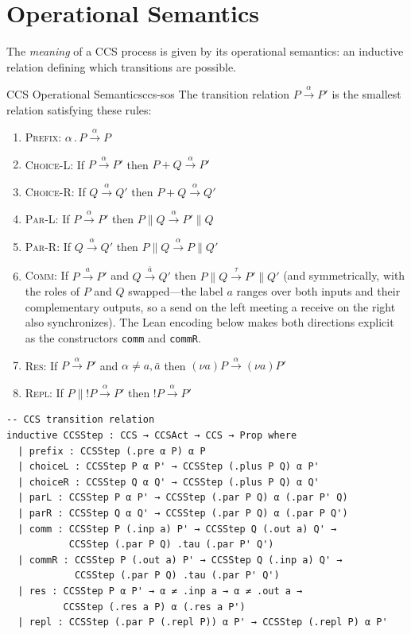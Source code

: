 \documentclass[11pt, a4paper, oneside]{book}
\newcommand{\Par}{\mathbin{\|}}
\newcommand{\pref}{\mathbin{.}}
\newcommand{\res}[1]{(\nu #1)}
\newcommand{\repl}{\mathbin{!}}
\newcommand{\lc}[1]{\texttt{#1}}
\begin{document}
\section{Operational Semantics}

The \emph{meaning} of a CCS process is given by its operational semantics:
an inductive relation defining which transitions are possible.

\begin{defn}{CCS Operational Semantics}{ccs-sos}
The transition relation $P \xrightarrow{\alpha} P'$ is the smallest relation
satisfying these rules:
\begin{enumerate}[nosep, label=(\textsc{\alph*})]
\item \textsc{Prefix:} $\alpha \pref P \xrightarrow{\alpha} P$
\item \textsc{Choice-L:} If $P \xrightarrow{\alpha} P'$ then
  $P + Q \xrightarrow{\alpha} P'$
\item \textsc{Choice-R:} If $Q \xrightarrow{\alpha} Q'$ then
  $P + Q \xrightarrow{\alpha} Q'$
\item \textsc{Par-L:} If $P \xrightarrow{\alpha} P'$ then
  $P \Par Q \xrightarrow{\alpha} P' \Par Q$
\item \textsc{Par-R:} If $Q \xrightarrow{\alpha} Q'$ then
  $P \Par Q \xrightarrow{\alpha} P \Par Q'$
\item \textsc{Comm:} If $P \xrightarrow{a} P'$ and $Q \xrightarrow{\bar{a}} Q'$
  then $P \Par Q \xrightarrow{\tau} P' \Par Q'$ (and symmetrically, with the
  roles of $P$ and $Q$ swapped---the label $a$ ranges over both inputs and
  their complementary outputs, so a send on the left meeting a receive on the
  right also synchronizes). The Lean encoding below makes both directions
  explicit as the constructors \lc{comm} and \lc{commR}.
\item \textsc{Res:} If $P \xrightarrow{\alpha} P'$ and $\alpha \neq a, \bar{a}$
  then $\res{a} P \xrightarrow{\alpha} \res{a} P'$
\item \textsc{Repl:} If $P \Par \repl P \xrightarrow{\alpha} P'$
  then $\repl P \xrightarrow{\alpha} P'$
\end{enumerate}
\end{defn}

\begin{leanbox}
\begin{verbatim}
-- CCS transition relation
inductive CCSStep : CCS → CCSAct → CCS → Prop where
  | prefix : CCSStep (.pre α P) α P
  | choiceL : CCSStep P α P' → CCSStep (.plus P Q) α P'
  | choiceR : CCSStep Q α Q' → CCSStep (.plus P Q) α Q'
  | parL : CCSStep P α P' → CCSStep (.par P Q) α (.par P' Q)
  | parR : CCSStep Q α Q' → CCSStep (.par P Q) α (.par P Q')
  | comm : CCSStep P (.inp a) P' → CCSStep Q (.out a) Q' →
           CCSStep (.par P Q) .tau (.par P' Q')
  | commR : CCSStep P (.out a) P' → CCSStep Q (.inp a) Q' →
            CCSStep (.par P Q) .tau (.par P' Q')
  | res : CCSStep P α P' → α ≠ .inp a → α ≠ .out a →
          CCSStep (.res a P) α (.res a P')
  | repl : CCSStep (.par P (.repl P)) α P' → CCSStep (.repl P) α P'
\end{verbatim}
\end{leanbox}
\end{document}

